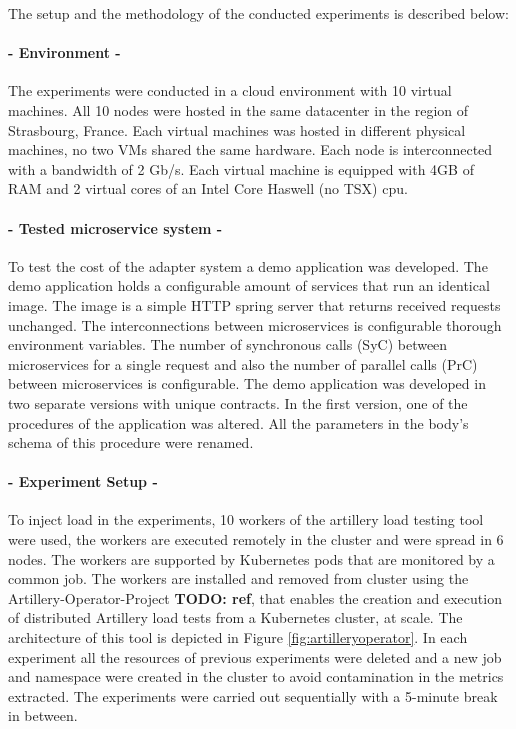 The setup and the methodology of the conducted experiments is described below:

\paragraph{- Environment -}

The experiments were conducted in a cloud environment with 10 virtual machines.
All 10 nodes were hosted in the same datacenter in the region of Strasbourg, France.
Each virtual machines was hosted in different physical machines, no two VMs shared the same hardware.
Each node is interconnected with a bandwidth of 2 Gb/s.
Each virtual machine is equipped with 4GB of RAM and 2 virtual cores of an Intel Core Haswell (no TSX) cpu.

\paragraph{- Tested microservice system -}

To test the cost of the adapter system a demo application was developed.
The demo application holds a configurable amount of services that run an identical image.
The image is a simple HTTP spring server that returns received requests unchanged.
The interconnections between microservices is configurable thorough environment variables.
The number of synchronous calls (SyC) between microservices for a single request and also the number of parallel calls (PrC) between microservices is configurable.
The demo application was developed in two separate versions with unique contracts.
In the first version, one of the procedures of the application was altered.
All the parameters in the body's schema of this procedure were renamed.

\paragraph{- Experiment Setup -}

To inject load in the experiments, 10 workers of the artillery load testing tool were used,
the workers are executed remotely in the cluster and were spread in 6 nodes.
The workers are supported by Kubernetes pods that are monitored by a common job.
The workers are installed and removed from cluster using the Artillery-Operator-Project \textbf{TODO: ref}, that enables
the creation and execution of distributed Artillery load tests from a Kubernetes cluster, at scale.
The architecture of this tool is depicted in Figure \ref{fig:artilleryoperator}.
In each experiment all the resources of previous experiments were deleted and a new job and namespace were created in the
cluster to avoid contamination in the metrics extracted.
The experiments were carried out sequentially with a 5-minute break in between.

